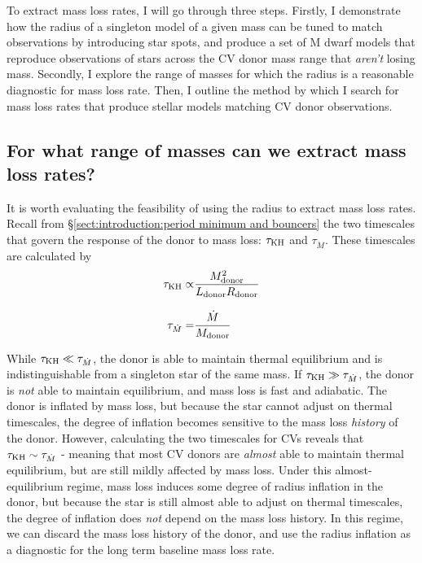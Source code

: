 To extract mass loss rates, I will go through three steps.
Firstly, I demonstrate how the radius of a singleton model of a given mass can be tuned to match observations by introducing star spots, and produce a set of M dwarf models that reproduce observations of stars across the CV donor mass range that \textit{aren't} losing mass.
Secondly, I explore the range of masses for which the radius is a reasonable diagnostic for mass loss rate.
Then, I outline the method by which I search for mass loss rates that produce stellar models matching CV donor observations.


\subsection{For what range of masses can we extract mass loss rates?}
\label{sect:modelling:MESA massloss allowable mass range}

It is worth evaluating the feasibility of using the radius to extract mass loss rates. Recall from \S\ref{sect:introduction:period minimum and bouncers} the two timescales that govern the response of the donor to mass loss: $\tau_{\rm KH}$ and $\tau_{\dot M}$. These timescales are calculated by
\begin{align}
    \tau_{\rm KH} \propto& \frac{M_{\rm donor}^2}{L_{\rm donor} R_{\rm donor}} \\[8pt]
    \tau_{\dot M} =& \frac{\dot M}{M_{\rm donor}}
\end{align}

While $\tau_{\rm KH} \ll \tau_{\dot M}$, the donor is able to maintain thermal equilibrium and is indistinguishable from a singleton star of the same mass.
If $\tau_{\rm KH} \gg \tau_{\dot M}$, the donor is \textit{not} able to maintain equilibrium, and mass loss is fast and adiabatic. The donor is inflated by mass loss, but because the star cannot adjust on thermal timescales, the degree of inflation becomes sensitive to the mass loss \textit{history} of the donor.
However, calculating the two timescales for CVs reveals that $\tau_{\rm KH} \sim \tau_{\dot M}$ \citep{knigge11} - meaning that most CV donors are \textit{almost} able to maintain thermal equilibrium, but are still mildly affected by mass loss.
Under this almost-equilibrium regime, mass loss induces some degree of radius inflation in the donor, but because the star is still almost able to adjust on thermal timescales, the degree of inflation does \textit{not} depend on the mass loss history. In this regime, we can discard the mass loss history of the donor, and use the radius inflation as a diagnostic for the long term baseline mass loss rate.


